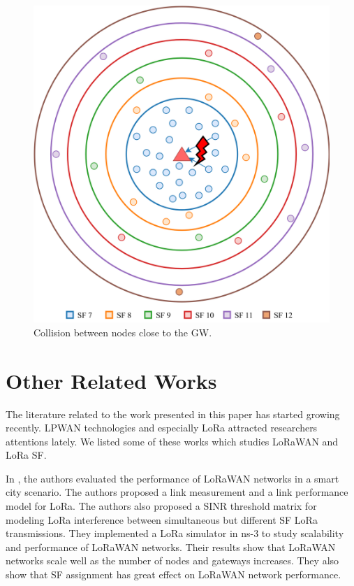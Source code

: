 \documentclass[conference]{IEEEtran}
\begin{document}
\begin{figure}
\centering
\includegraphics[width=\linewidth]{collision}
\caption{Collision between nodes close to the GW.}
\label{fig:collision}
\end{figure}


\section{Other Related Works} \label{Other Related Works}
The literature related to the work presented in this paper has started growing recently. LPWAN technologies and especially LoRa  attracted researchers attentions lately. We listed some of these works which studies LoRaWAN and LoRa SF.

\par In \cite{7996384}, the authors evaluated the performance of LoRaWAN networks in a smart city scenario. The authors proposed a link measurement and a link performance model for LoRa. The authors also proposed a SINR threshold matrix for modeling LoRa interference between simultaneous but different SF LoRa transmissions. They implemented a LoRa simulator in ns-3 to study scalability and performance of LoRaWAN networks. Their results show that LoRaWAN networks scale well as the number of nodes and gateways increases. They also show that SF assignment has great effect on LoRaWAN network performance.
\end{document}
